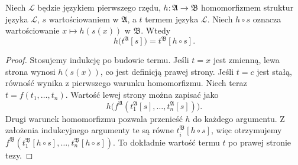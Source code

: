 \begin{lemat}\label{lem:model-homo-terms}
Niech $\mathcal L$ będzie językiem pierwszego rzędu,
$h:\mathfrak A\to\mathfrak B$ homomorfizmem struktur języka
$\mathcal L$, $s$ wartościowaniem w $\mathfrak A$,
a $t$ termem języka $\mathcal L$.
Niech $h\circ s$ oznacza wartościowanie $x\mapsto h(s(x))$ w $\mathfrak B$.
Wtedy
\[
h\bigl(t^{\mathfrak A}[s]\bigr)=t^{\mathfrak B}[h\circ s].
\]
\end{lemat}
\begin{proof}
Stosujemy indukcję po budowie termu. Jeśli $t=x$ jest zmienną,
lewa strona wynosi $h(s(x))$, co jest definicją prawej strony.
Jeśli $t=c$ jest stałą, równość wynika z pierwszego warunku
homomorfizmu. Niech teraz $t=f(t_1,\ldots,t_n)$.
Wartość lewej strony można zapisać jako
\[
h\bigl(f^{\mathfrak A}(t_1^{\mathfrak A}[s],\ldots,
 t_n^{\mathfrak A}[s])\bigr).
\]
Drugi warunek homomorfizmu pozwala przenieść $h$ do każdego argumentu.
Z założenia indukcyjnego argumenty te są równe
$t_i^{\mathfrak B}[h\circ s]$, więc otrzymujemy
$f^{\mathfrak B}(t_1^{\mathfrak B}[h\circ s],\ldots,t_n^{\mathfrak B}[h\circ s])$.
To dokładnie wartość termu $t$ po prawej stronie tezy.
\end{proof}


